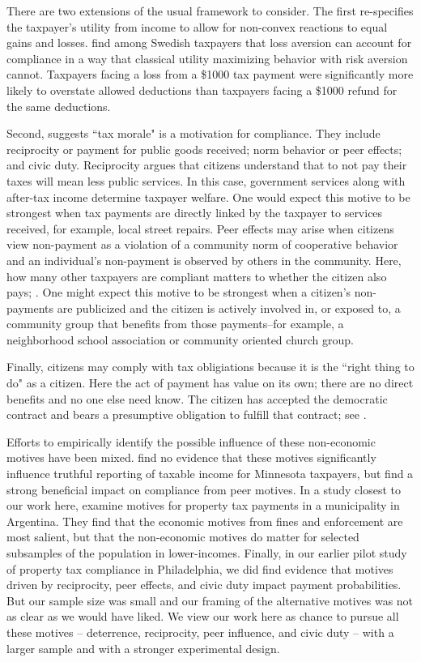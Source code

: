 \documentclass[12pt,titlepage]{article}
\begin{document}
There are two extensions of the usual framework to consider. 
The first re-specifies the taxpayer’s utility from income to allow for
non-convex reactions to equal gains and losses.   \citet{engstrom} find among
Swedish taxpayers that loss aversion can account for compliance in 
a way that classical utility maximizing behavior with risk aversion 
cannot.  Taxpayers facing a loss from a \$1000 tax payment were
significantly more likely to overstate allowed deductions than
taxpayers facing a \$1000 refund for the same deductions.  

Second, \citet{luttmer} suggests ``tax morale" is a motivation for compliance.  
They include reciprocity or payment for public goods received; 
norm behavior or peer effects; and civic duty.   Reciprocity argues 
that citizens understand that to not pay their taxes will mean less 
public services.   In this case, government services along with 
after-tax income determine taxpayer welfare.  One would expect this 
motive to be strongest when tax payments are directly linked by the 
taxpayer to services received, for example, local street repairs.   
Peer effects may arise when citizens view non-payment as a violation 
of a community norm of cooperative behavior and an individual’s 
non-payment is observed by others in the community.  Here, how many 
other taxpayers are compliant matters to whether the citizen 
also pays; \citet{posner}.   One might expect this motive to be 
strongest when a citizen’s non-payments are publicized and the citizen 
is actively involved in, or exposed to,  a community group that benefits 
from those payments--for example, a neighborhood school association or 
community oriented church group.  

Finally, citizens may comply with tax obligiations because it is the ``right thing to do" as a citizen.  
Here the act of payment has value on its own; there are no direct 
benefits and no one else need know.  The citizen has accepted the 
democratic contract and bears a presumptive obligation to fulfill 
that contract; see \citet[350-355]{rawls}.  

Efforts to empirically identify the possible influence of these non-economic 
motives have been mixed.   \citet{blumenthal} find no evidence that 
these motives significantly influence truthful reporting of taxable income 
for Minnesota taxpayers, but \citet{hallsworth} find a strong 
beneficial impact on compliance from peer motives.  In a study closest to 
our work here, \citet{castro} examine motives for property 
tax payments in a municipality in Argentina.  They find that the economic 
motives from fines and enforcement are most salient, but that the non-economic 
motives do matter for selected subsamples of the population in 
lower-incomes.   Finally, in our earlier pilot study of property tax 
compliance in Philadelphia, we did find evidence that motives driven by 
reciprocity, peer effects, and civic duty impact payment 
probabilities. But our sample size was small and our framing of the 
alternative motives was not as clear as we would have liked\citet{chirico}.  
We view our work here as chance to pursue all these motives – deterrence, reciprocity, peer influence, and civic duty – 
with a larger sample and with a stronger experimental design.     
\end{document}
